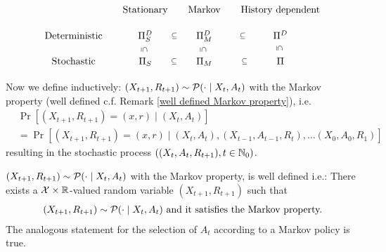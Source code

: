 \begin{definition}
\[\begin{tikzcd}[row sep = small, column sep = small]
		&\text{Stationary} & \text{Markov} & \text{History dependent}
		\\
		\text{Deterministic} 
		& \detPolicy
			\arrow[draw=none, shift right=2]{r}{\subseteq} 
			\ar[draw=none, shift right=2.7]{d}{\vsubseteq}
		& \Pi_M^D
			\arrow[draw=none, shift right=2]{r}{\subseteq} 
			\ar[draw=none, shift right=2.7]{d}{\vsubseteq}
		& \Pi^D
			\ar[draw=none, shift right=2.7]{d}{\vsubseteq}
		\\ 
		\text{Stochastic} 
		& \statPolicy 
			\arrow[draw=none, shift right=2]{r}{\subseteq} 
		& \Pi_M
			\arrow[draw=none, shift right=2]{r}{\subseteq}
		& \Pi
	\end{tikzcd}
	\]
\end{definition}

Now we define inductively: \((X_{t+1}, R_{t+1})\sim\mathcal{P}(\cdot\mid X_t, A_t)\) with the Markov property (well defined c.f. Remark \ref{well defined Markov property}), i.e.
\begin{align}
\label{X,R Markov}
	&\Pr[(X_{t+1}, R_{t+1})=(x,r)\mid (X_t,A_t)]\\
	&=\Pr[(X_{t+1},R_{t+1})=(x,r) \mid (X_t,A_t),(X_{t-1},A_{t-1},R_t), 
	\dots (X_0,A_0,R_1)] \nonumber
\end{align}
resulting in the stochastic process \(((X_t,A_t,R_{t+1}), t\in \mathbb{N}_0)\).
\begin{remark}\label{well defined Markov property}
	\((X_{t+1}, R_{t+1})\sim\mathcal{P}(\cdot\mid X_t, A_t)\) with the Markov property, is well defined i.e.:
	There exists a \(\mathcal{X}\times\mathbb{R}\)-valued random variable \((X_{t+1}, R_{t+1})\)
	such that
	\begin{align*}
		(X_{t+1}, R_{t+1})\sim\mathcal{P}(\cdot\mid X_t, A_t) \text{ and it satisfies the Markov property.}
	\end{align*}
	The analogous statement for the selection of \(A_t\) according to a Markov policy is true.
\end{remark}
